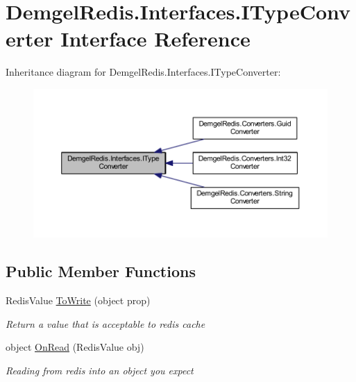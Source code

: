 \hypertarget{interface_demgel_redis_1_1_interfaces_1_1_i_type_converter}{}\section{Demgel\+Redis.\+Interfaces.\+I\+Type\+Converter Interface Reference}
\label{interface_demgel_redis_1_1_interfaces_1_1_i_type_converter}


Inheritance diagram for Demgel\+Redis.\+Interfaces.\+I\+Type\+Converter\+:
\nopagebreak
\begin{figure}[H]
\begin{center}
\leavevmode
\includegraphics[width=350pt]{interface_demgel_redis_1_1_interfaces_1_1_i_type_converter__inherit__graph}
\end{center}
\end{figure}
\subsection*{Public Member Functions}
\begin{DoxyCompactItemize}
\item 
Redis\+Value \hyperlink{interface_demgel_redis_1_1_interfaces_1_1_i_type_converter_a52fb88f7189aa7ac5edf224226746410}{To\+Write} (object prop)
\begin{DoxyCompactList}\small\item\em Return a value that is acceptable to redis cache \end{DoxyCompactList}\item 
object \hyperlink{interface_demgel_redis_1_1_interfaces_1_1_i_type_converter_ac26577bf58aa235826e6d58c6dd18de3}{On\+Read} (Redis\+Value obj)
\begin{DoxyCompactList}\small\item\em Reading from redis into an object you expect \end{DoxyCompactList}\end{DoxyCompactItemize}


